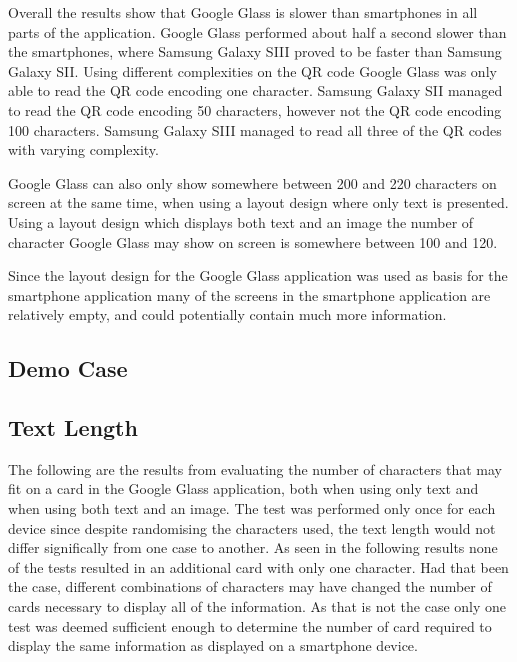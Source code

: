 Overall the results show that Google Glass is slower than smartphones in all parts of the application. Google Glass performed about half a second slower than the smartphones, where Samsung Galaxy SIII proved to be faster than Samsung Galaxy SII. Using different complexities on the QR code Google Glass was only able to read the QR code encoding one character. Samsung Galaxy SII managed to read the QR code encoding 50 characters, however not the QR code encoding 100 characters. Samsung Galaxy SIII managed to read all three of the QR codes with varying complexity.

Google Glass can also only show somewhere between 200 and 220 characters on screen at the same time, when using a layout design where only text is presented. Using a layout design which displays both text and an image the number of character Google Glass may show on screen is somewhere between 100 and 120.

Since the layout design for the Google Glass application was used as basis for the smartphone application many of the screens in the smartphone application are relatively empty, and could potentially contain much more information.

\subsection{Demo Case}



\subsection{Text Length}
The following are the results from evaluating the number of characters that may fit on a card in the Google Glass application, both when using only text and when using both text and an image. The test was performed only once for each device since despite randomising the characters used, the text length would not differ significally from one case to another. As seen in the following results none of the tests resulted in an additional card with only one character. Had that been the case, different combinations of characters may have changed the number of cards necessary to display all of the information. As that is not the case only one test was deemed sufficient enough to determine the number of card required to display the same information as displayed on a smartphone device.

